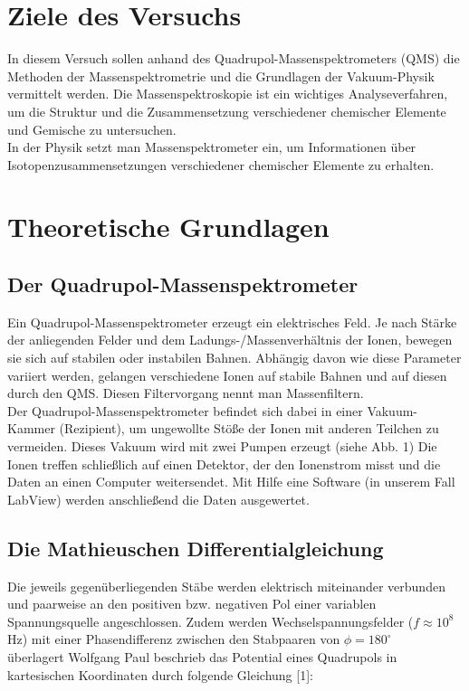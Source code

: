 \section{Ziele des Versuchs}
In diesem Versuch sollen anhand des Quadrupol-Massenspektrometers (QMS) die Methoden der Massenspektrometrie und die Grundlagen der Vakuum-Physik vermittelt werden. Die Massenspektroskopie ist ein wichtiges Analyseverfahren, um die Struktur und die Zusammensetzung verschiedener chemischer Elemente und Gemische zu untersuchen.\\
In der Physik setzt man Massenspektrometer ein, um Informationen über Isotopenzusammensetzungen verschiedener chemischer Elemente zu erhalten.

\section{Theoretische Grundlagen}
\subsection{Der Quadrupol-Massenspektrometer}
Ein Quadrupol-Massenspektrometer erzeugt ein elektrisches Feld. Je nach Stärke der anliegenden Felder und dem Ladungs-/Massenverhältnis der Ionen, bewegen sie sich auf stabilen oder instabilen Bahnen. Abhängig davon wie diese Parameter variiert werden, gelangen verschiedene Ionen auf stabile Bahnen und auf diesen durch den QMS. Diesen Filtervorgang nennt man Massenfiltern.\\
Der Quadrupol-Massenspektrometer befindet sich dabei in einer Vakuum-Kammer (Rezipient), um ungewollte Stöße der Ionen mit anderen Teilchen zu vermeiden. Dieses Vakuum wird mit zwei Pumpen erzeugt (siehe Abb. 1) Die Ionen treffen schließlich auf einen Detektor, der den Ionenstrom misst und die Daten an einen Computer weitersendet. Mit Hilfe eine Software (in unserem Fall LabView) werden anschließend die Daten ausgewertet.


\newpage
\subsection{Die Mathieuschen Differentialgleichung}
Die jeweils gegenüberliegenden Stäbe werden elektrisch miteinander verbunden und paarweise an den positiven bzw. negativen Pol einer variablen Spannungsquelle angeschlossen. Zudem werden Wechselspannungsfelder ($f \approx 10^8$ Hz) mit einer Phasendifferenz zwischen den Stabpaaren von $\phi = 180^{\circ}$\\ überlagert
Wolfgang Paul beschrieb das Potential eines Quadrupols in kartesischen Koordinaten durch folgende Gleichung [1]:

